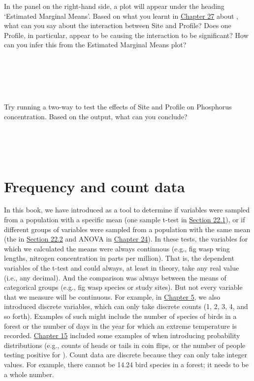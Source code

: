 \documentclass[
  openany]{krantz}
\begin{document}
In the panel on the right-hand side, a plot will appear under the heading `Estimated Marginal Means'.
Based on what you learnt in \protect\hyperlink{Chapter_27}{Chapter 27} about , what can you say about the interaction between Site and Profile?
Does one Profile, in particular, appear to be causing the interaction to be significant?
How can you infer this from the Estimated Marginal Means plot?

\begin{verbatim}





\end{verbatim}

Try running a two-way  to test the effects of Site and Profile on Phosphorus concentration.
Based on the  output, what can you conclude?

\begin{verbatim}




\end{verbatim}

\hypertarget{Chapter_29}{%
\chapter{Frequency and count data}\label{Chapter_29}}

In this book, we have introduced  as a tool to determine if variables were sampled from a population with a specific mean (one sample t-test in \protect\hyperlink{one-sample-t-test}{Section 22.1}), or if different groups of variables were sampled from a population with the same mean (the  in \protect\hyperlink{independent-samples-t-test}{Section 22.2} and ANOVA in \protect\hyperlink{Chapter_24}{Chapter 24}).
In these tests, the variables for which we calculated the means were always continuous (e.g., fig wasp wing lengths, nitrogen concentration in parts per million).
That is, the dependent variables of the t-test and  could always, at least in theory, take any real value (i.e., any decimal).
And the comparison was always between the means of categorical groups (e.g., fig wasp species or study sites).
But not every variable that we measure will be continuous.
For example, in \protect\hyperlink{Chapter_5}{Chapter 5}, we also introduced discrete variables, which can only take discrete counts (1, 2, 3, 4, and so forth).
Examples of such \textbf{} might include the number of species of birds in a forest or the number of days in the year for which an extreme temperature is recorded.
\protect\hyperlink{Chapter_15}{Chapter 15} included some examples of  when introducing probability distributions (e.g., counts of heads or tails in coin flips, or the number of people testing positive for ).
Count data are discrete because they can only take integer values.
For example, there cannot be 14.24 bird species in a forest; it needs to be a whole number.
\end{document}
